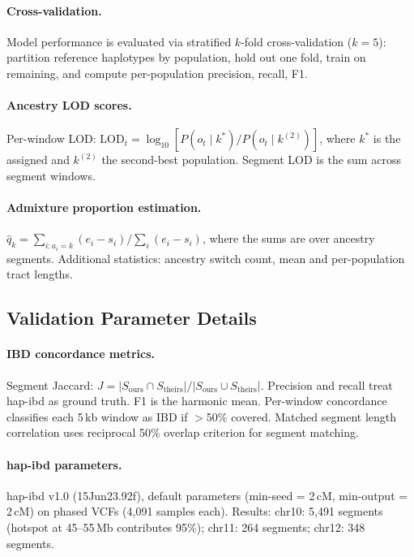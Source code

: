\documentclass[11pt]{article}
\begin{document}
\paragraph{Cross-validation.}
Model performance is evaluated via stratified $k$-fold cross-validation ($k = 5$): partition reference haplotypes by population, hold out one fold, train on remaining, and compute per-population precision, recall, F1.

\paragraph{Ancestry LOD scores.}
Per-window LOD: $\text{LOD}_t = \log_{10}[P(o_t \mid k^*) / P(o_t \mid k^{(2)})]$, where $k^*$ is the assigned and $k^{(2)}$ the second-best population. Segment LOD is the sum across segment windows.

\paragraph{Admixture proportion estimation.}
$\hat{q}_k = \sum_{i:a_i=k}(e_i - s_i) / \sum_i(e_i - s_i)$, where the sums are over ancestry segments. Additional statistics: ancestry switch count, mean and per-population tract lengths.

\subsection{Validation Parameter Details}
\label{sec:supp_validation_details}

\paragraph{IBD concordance metrics.}
Segment Jaccard: $J = |S_{\text{ours}} \cap S_{\text{theirs}}| / |S_{\text{ours}} \cup S_{\text{theirs}}|$. Precision and recall treat hap-ibd as ground truth. F1 is the harmonic mean. Per-window concordance classifies each 5\,kb window as IBD if $>$50\% covered. Matched segment length correlation uses reciprocal 50\% overlap criterion for segment matching.

\paragraph{hap-ibd parameters.}
hap-ibd v1.0 (15Jun23.92f), default parameters (min-seed = 2\,cM, min-output = 2\,cM) on phased VCFs (4,091 samples each). Results: chr10: 5,491 segments (hotspot at 45--55\,Mb contributes 95\%); chr11: 264 segments; chr12: 348 segments.
\end{document}
